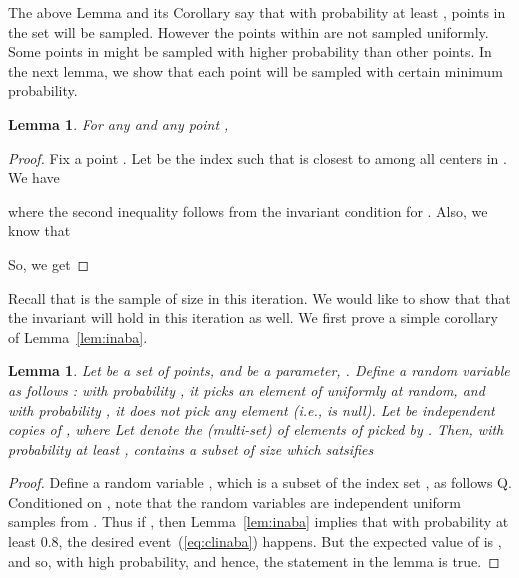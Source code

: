 \documentclass[a4paper]{article}
\newtheorem{lemma}[theorem]{Lemma}
\begin{document}
The above Lemma and its Corollary say that with probability at least ,
points in the set  will be sampled. However the points within  are not sampled uniformly.
Some points in  might be sampled with higher probability than other points.
In the next lemma, we show that each point will be sampled with certain minimum probability.

\begin{lemma}
\label{lem:key}
For any  and any point , 
\end{lemma}
\begin{proof}
Fix a point .
Let  be the
 index such that  is closest to  among all centers in .
We have

where the second inequality follows from the invariant condition for .
Also, we know that

So, we get

\end{proof}

Recall that  is the sample of size  in this iteration. We would like to show that  that the invariant
will hold in this iteration as well. We first prove a simple corollary of Lemma~\ref{lem:inaba}.

\begin{lemma}
\label{lem:clinaba}
Let  be a set of  points, and  be a parameter, . Define a random variable  as follows :
with probability , it picks an element of  uniformly at random, and with  probability , it does not
pick any element (i.e., is null). Let  be  independent copies of , where 
Let  denote the (multi-set) of elements of  picked by . Then, with probability at least ,
 contains a subset  of size  which satsifies

\end{lemma}
\begin{proof}
 Define a random variable , which is a subset of the index set , as follows
Q. Conditioned on , note that the random variables  are independent uniform samples from . Thus if , then Lemma~\ref{lem:inaba} implies that with
probability at least 0.8, the desired event~(\ref{eq:clinaba}) happens. But the expected value of  is , and so,
 with high probability, and hence, the statement in the lemma is true.
\end{proof}
\end{document}
